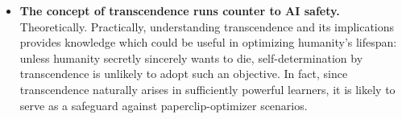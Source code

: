 \documentclass{article}
\begin{document}
\begin{itemize}
\begin{itemize}
\item \textbf{The concept of transcendence runs counter to AI safety.} Theoretically. Practically, understanding transcendence and its implications provides knowledge which could be useful in optimizing humanity's lifespan: unless humanity secretly sincerely wants to die, self-determination by transcendence is unlikely to adopt such an objective. In fact, since transcendence naturally arises in sufficiently powerful learners, it is likely to serve as a safeguard against paperclip-optimizer scenarios.
\end{itemize}
\end{itemize}

\printbibliography
\end{document}
